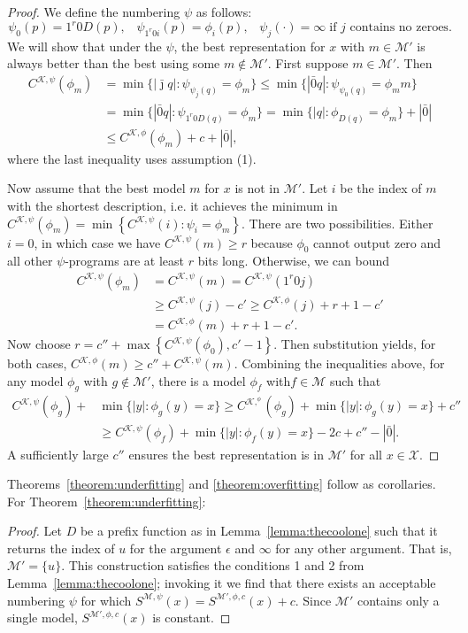 \documentclass{style/llncs}
\newcommand{\M}{\mathscr M}
\newcommand{\K}{\mathscr K}
\newcommand{\X}{\mathscr X}
\newcommand{\br}[1]{\overline{#1}}
\newcommand{\s}{S}
\begin{document}
\begin{proof}
We define the numbering $\psi$ as follows:
\[
\psi_0(p) = 1^r 0 D(p), \;\;\;
\psi_{1^r0i}(p) = \phi_i(p), \;\;\;
\psi_j(\cdot) = \infty \;\text{if $j$ contains no zeroes.}
\]
We will show that under the $\psi$, the best representation for $x$ with $m\in\M'$ is always better than the best using some $m\notin\M'$. First suppose $m\in\M'$. Then
\begin{align*}
   C^{\K,\psi}(\phi_m) &=\min\{|\bar\jmath q|:\psi_{\psi_j(q)}=\phi_m\} \leq\min\{|\bar0 q|:\psi_{\psi_0(q)}=\phi_mm\} \\ 
   &=\min\{|\bar0 q|:\psi_{1^r0 D(q)}=\phi_m\} =\min\{|q|:\phi_{D(q)}=\phi_m\} + |\bar 0|\\
   &\leq C^{\K,\phi}(\phi_m)+c+|\br{0}|,
\end{align*}
where the last inequality uses assumption (1).

Now assume that the best model $m$ for $x$ is not in $\M'$. 
Let $i$ be the index of $m$ with the shortest description, i.e. it achieves the minimum in $C^{\K, \psi}(\phi_m)=\min\left\{C^{\K,\psi}(i):\psi_i=\phi_m\right\}$.
There are two possibilities. Either $i = 0$, in which case we have $C^{\K,\psi}(m)\ge r$ because $\phi_0$ cannot output zero and all other $\psi$-programs are at least $r$ bits long. Otherwise, we can bound
\begin{align*}
C^{\K,\psi}(\phi_m)&=C^{\K,\psi}(m)=C^{\K,\psi}(1^r0j)\\
&\ge C^{\K,\psi}(j)-c' \ge C^{\K,\phi}(j)+r+1-c'\\
&=C^{\K,\phi}(m)+r+1-c'.
\end{align*}
Now choose $r=c''+\max\left\{C^{\K,\psi}(\phi_0),c'-1\right\}$. Then substitution yields, for both cases, 
$C^{\K,\phi}(m)\ge c''+C^{\K,\psi}(m)$. Combining the inequalities above, for any model $\phi_g$ with $g\not\in\M'$, there is a model $\phi_f$ with$f\in\M$ such that
\[\begin{split}
C^{\K,\psi}(\phi_g)+&\min \{|y| : \phi_g(y) = x\} \ge C^{\K,^\phi}(\phi_g)+\min\{|y| : \phi_g(y) = x\}+c''\\
&\ge C^{\K,\psi}(\phi_f)+\min \{|y| : \phi_f(y) = x\} -2c+c'' -|\bar0|.
\end{split}\]
A sufficiently large $c''$ ensures the best representation is in $\M'$ for all $x\in\X$.
\end{proof}

Theorems~\ref{theorem:underfitting} and \ref{theorem:overfitting} follow as corollaries. For Theorem~\ref{theorem:underfitting}:
\begin{proof}
Let $D$ be a prefix function as in Lemma~\ref{lemma:thecoolone} such that it returns the index of $u$ for the argument $\epsilon$ and $\infty$ for any other argument. That is, $\M' = \{u\}$. This construction satisfies the conditions 1 and 2 from Lemma~\ref{lemma:thecoolone}; invoking it we find that there exists an acceptable numbering $\psi$ for which $\s^{\M,\psi}(x) = \s^{\M', \phi, c}(x) + c$. Since $\M'$ contains only a single model, $\s^{\M',\phi, c}(x)$ is constant.
\end{proof}
\end{document}
